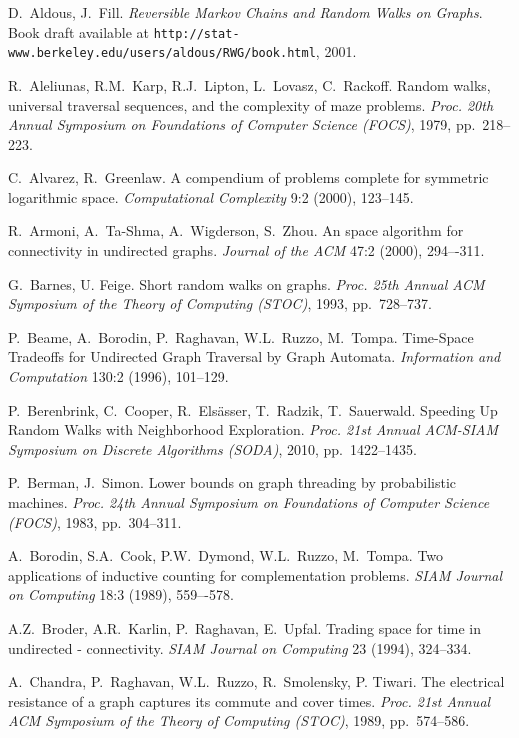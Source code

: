 \documentclass[11pt,a4paper]{article}
\renewcommand{\*}{\hspace*{5mm}}
\begin{document}
\newpage
{}
\setcounter{page}{1}
\begin{thebibliography}{19}

D.~Aldous, J.~Fill.
\emph{Reversible Markov Chains and Random Walks on Graphs}.
Book draft available at \texttt{http://stat-www.berkeley.edu/users/aldous/RWG/book.html}, 2001.

R.~Aleliunas, R.M.~Karp, R.J.~Lipton, L.~Lovasz, C.~Rackoff.
Random walks, universal traversal sequences, and the complexity of maze problems.
\emph{Proc. 20th Annual Symposium on Foundations of Computer Science (FOCS)}, 1979, pp.~218--223.

C.~Alvarez, R.~Greenlaw.
A compendium of problems complete for symmetric logarithmic space.
\emph{Computational Complexity }9:2 (2000), 123--145.

R.~Armoni, A.~Ta-Shma, A.~Wigderson, S.~Zhou.
An  space algorithm for  connectivity in undirected graphs.
\emph{Journal of the ACM }47:2 (2000), 294–-311.

G.~Barnes, U. Feige.
Short random walks on graphs.
\emph{Proc. 25th Annual ACM Symposium of the Theory of Computing (STOC)}, 1993, pp.~728--737.

P.~Beame, A.~Borodin, P.~Raghavan, W.L.~Ruzzo, M.~Tompa.
Time-Space Tradeoffs for Undirected Graph Traversal by Graph Automata.
\emph{Information and Computation }130:2 (1996), 101--129.

P.~Berenbrink, C.~Cooper, R.~Els\"{a}sser, T.~Radzik, T.~Sauerwald.
Speeding Up Random Walks with Neighborhood Exploration.
\emph{Proc. 21st Annual ACM-SIAM Symposium on Discrete Algorithms (SODA)}, 2010, pp.~1422--1435.

P.~Berman, J.~Simon.
Lower bounds on graph threading by probabilistic machines.
\emph{Proc. 24th Annual Symposium on Foundations of Computer Science (FOCS)}, 1983, pp.~304--311.

A.~Borodin, S.A.~Cook, P.W.~Dymond, W.L.~Ruzzo, M.~Tompa.
Two applications of inductive counting for complementation problems.
\emph{SIAM Journal on Computing }18:3 (1989), 559–-578.

A.Z.~Broder, A.R.~Karlin, P.~Raghavan, E.~Upfal.
Trading space for time in undirected - connectivity.
\emph{SIAM Journal on Computing }23 (1994), 324--334.

A.~Chandra, P.~Raghavan, W.L.~Ruzzo, R.~Smolensky, P. Tiwari.
The electrical resistance of a graph captures its commute and cover times.
\emph{Proc. 21st Annual ACM Symposium of the Theory of Computing (STOC)}, 1989, pp.~574--586.


\end{thebibliography}
\end{document}
